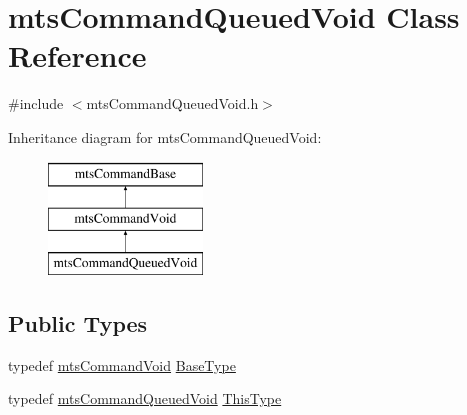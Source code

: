 \hypertarget{classmts_command_queued_void}{\section{mts\-Command\-Queued\-Void Class Reference}
\label{classmts_command_queued_void}
}


{\ttfamily \#include $<$mts\-Command\-Queued\-Void.\-h$>$}

Inheritance diagram for mts\-Command\-Queued\-Void\-:\begin{figure}[H]
\begin{center}
\leavevmode
\includegraphics[height=3.000000cm]{d3/d05/classmts_command_queued_void}
\end{center}
\end{figure}
\subsection*{Public Types}
\begin{DoxyCompactItemize}
\item 
typedef \hyperlink{classmts_command_void}{mts\-Command\-Void} \hyperlink{classmts_command_queued_void_a5e83cb9e30b4d01f5e133d2e809a7379}{Base\-Type}
\item 
typedef \hyperlink{classmts_command_queued_void}{mts\-Command\-Queued\-Void} \hyperlink{classmts_command_queued_void_a2bce402cdb87e0eeff9903a19a48b630}{This\-Type}
\end{DoxyCompactItemize}
